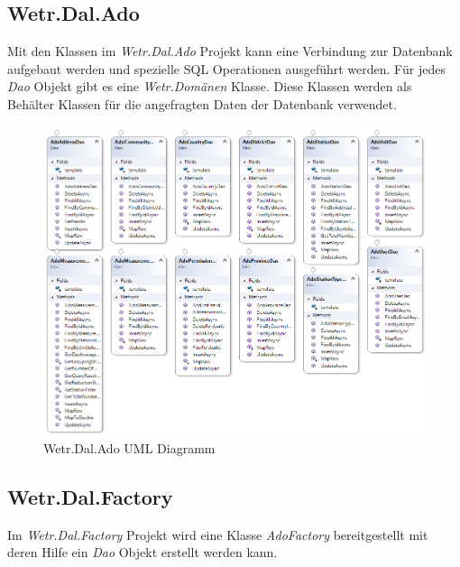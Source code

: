 \newpage
\subsection{Wetr.Dal.Ado}
Mit den Klassen im \textit{Wetr.Dal.Ado} Projekt kann eine Verbindung zur Datenbank aufgebaut werden und spezielle SQL Operationen ausgeführt werden. Für jedes \textit{Dao} Objekt gibt es eine \textit{Wetr.Domänen} Klasse. Diese Klassen werden als Behälter Klassen für die angefragten Daten der Datenbank verwendet.

\begin{figure}[H]
\centering
\includegraphics[width=\textwidth]{pictures/Wetr_Dal_Ado.png}
\caption{Wetr.Dal.Ado UML Diagramm}
\label{fig:Wetr.Dal.Ado}
\end{figure}
\raggedright

\newpage
\subsection{Wetr.Dal.Factory}
Im \textit{Wetr.Dal.Factory} Projekt wird eine Klasse \textit{AdoFactory} bereitgestellt mit deren Hilfe ein \textit{Dao} Objekt erstellt werden kann.


